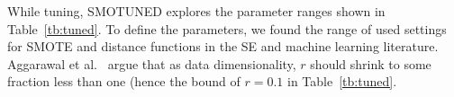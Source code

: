\documentclass[10pt,conference]{IEEEtran}
\theoremstyle{break}
\theoremstyle{break}
\newcommand{\sma}{{\sc SMOTE}}
\newcommand{\smb}{{\sc SMOTUNED}}
\begin{document}
 While tuning, {\smb} explores 
the parameter ranges shown  in  Table~\ref{tb:tuned}. To define
the parameters, we found the range of used settings for {\sma} and distance functions
in the   SE and machine learning  literature.  Aggarawal et al.~\cite{aggarwal2001surprising}
argue that as data dimensionality, $r$ should shrink to some fraction less than one
(hence the bound of $r=0.1$ in Table~\ref{tb:tuned}. 



\end{document}
